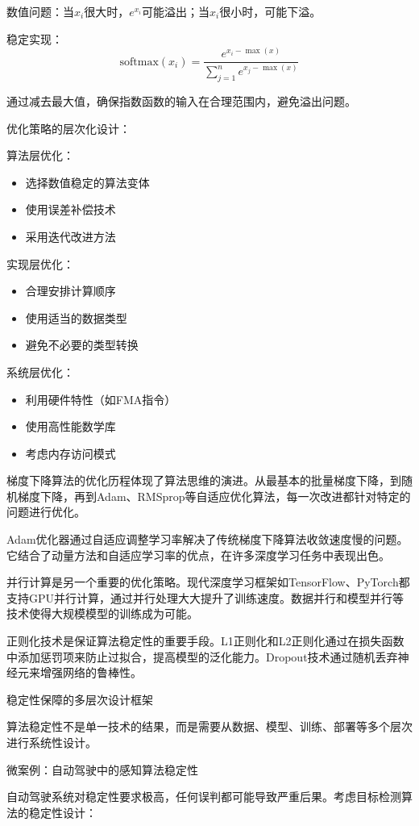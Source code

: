 数值问题：当$x_i$很大时，$e^{x_i}$可能溢出；当$x_i$很小时，可能下溢。

稳定实现：
$$\text{softmax}(x_i) = \frac{e^{x_i - \max(x)}}{\sum_{j=1}^n e^{x_j - \max(x)}}$$

通过减去最大值，确保指数函数的输入在合理范围内，避免溢出问题。

优化策略的层次化设计：

算法层优化：
\begin{itemize}
\item 选择数值稳定的算法变体
\item 使用误差补偿技术
\item 采用迭代改进方法
\end{itemize}

实现层优化：
\begin{itemize}
\item 合理安排计算顺序
\item 使用适当的数据类型
\item 避免不必要的类型转换
\end{itemize}

系统层优化：
\begin{itemize}
\item 利用硬件特性（如FMA指令）
\item 使用高性能数学库
\item 考虑内存访问模式
\end{itemize}

梯度下降算法的优化历程体现了算法思维的演进。从最基本的批量梯度下降，到随机梯度下降，再到Adam、RMSprop等自适应优化算法，每一次改进都针对特定的问题进行优化。

Adam优化器通过自适应调整学习率解决了传统梯度下降算法收敛速度慢的问题。它结合了动量方法和自适应学习率的优点，在许多深度学习任务中表现出色。

并行计算是另一个重要的优化策略。现代深度学习框架如TensorFlow、PyTorch都支持GPU并行计算，通过并行处理大大提升了训练速度。数据并行和模型并行等技术使得大规模模型的训练成为可能。

正则化技术是保证算法稳定性的重要手段。L1正则化和L2正则化通过在损失函数中添加惩罚项来防止过拟合，提高模型的泛化能力。Dropout技术通过随机丢弃神经元来增强网络的鲁棒性。

稳定性保障的多层次设计框架

算法稳定性不是单一技术的结果，而是需要从数据、模型、训练、部署等多个层次进行系统性设计。

微案例：自动驾驶中的感知算法稳定性

自动驾驶系统对稳定性要求极高，任何误判都可能导致严重后果。考虑目标检测算法的稳定性设计：

